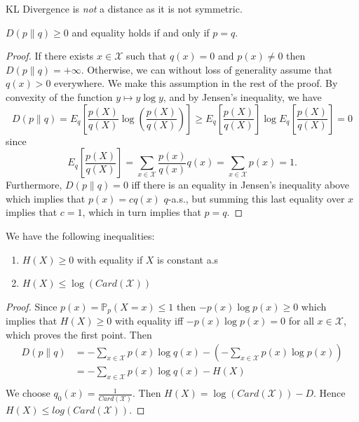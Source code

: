 \documentclass[12pt]{report}
\def\PP{\mathbb{P}}
\begin{document}
\begin{danger}
KL Divergence is \emph{not} a distance as it is not symmetric.
\end{danger}

\begin{proposition}
$D(p\parallel q) \geq 0$ and equality holds if and only if $p=q$.
\end{proposition}

\begin{proof}
If there exists $x \in \mathcal{X}$ such that $q(x)=0$ and $p(x)\neq 0$ then $D(p\parallel q) =+\infty$. Otherwise, we can without loss of generality assume that $q(x)>0$ everywhere. We make this assumption in the rest of the proof.
By convexity of the function $y \mapsto y \log y$, and by Jensen's inequality, we have
$$D(p\parallel q) =  E_{q} \left[ \frac{p(X)}{q(X)} \log  \left(\frac{p(X)}{q(X)}\right) \right] \geq E_{q} \left[\frac{p(X)}{q(X)}\right]  \log E_{q} \left[\frac{p(X)}{q(X)}\right] =  0$$
since
$$ E_{q} \left[\frac{p(X)}{q(X)}\right]= \sum_{x\in\mathcal{X}} \frac{p(x)}{q(x)}q(x) = \sum_{x\in\mathcal{X}} p(x) =1.$$
Furthermore, $D(p\parallel q)=0$ iff there is an equality in Jensen's inequality above which implies that $p(x)=cq(x)$ $q$-a.s., but summing this last equality over $x$ implies that $c=1$, which in turn implies that $p=q$.
\end{proof}

\begin{proposition}
We have the following inequalities: 
\begin{enumerate}
\item $H(X) \geq 0$ with equality if $X$ is constant a.s
\item $H(X) \leq \log (Card(\mathcal{X}))$
\end{enumerate}
\end{proposition}

\begin{proof}
Since $p(x)=\PP_p(X=x) \leq 1$ then $-p(x)\log p(x)\geq 0$ which implies that $H(X)\geq 0$ with equality iff $-p(x)\log p(x)=0$ for all $x \in \mathcal{X}$, which proves the first point. 
Then 
$$\begin{aligned}
D(p\parallel q) &=- \sum_{x\in\mathcal{X}} p(x) \log q(x) - (-\sum_{x\in\mathcal{X}} p(x) \log p(x))\\
&=- \sum_{x\in\mathcal{X}} p(x) \log q(x)  -H(X)\\
\end{aligned}$$
We choose $q_0 (x) = \frac{1}{Card(\mathcal{X})}$. Then $H(X) = \log (Card(\mathcal{X}))-D$.
Hence $H(X) \leq log (Card(\mathcal{X}))$.
\end{proof}
\end{document}
